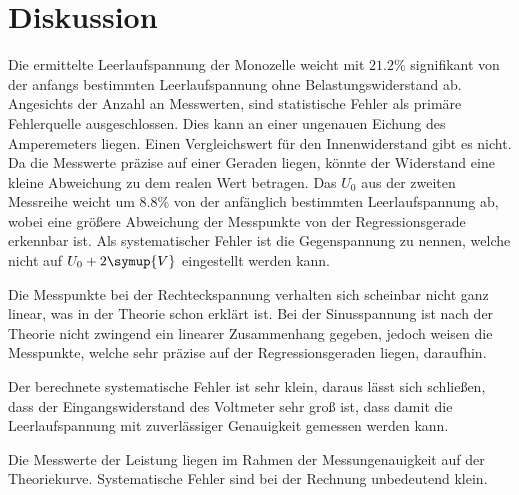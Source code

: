 \section{Diskussion}
\label{sec:Diskussion}

Die ermittelte Leerlaufspannung der Monozelle weicht mit $21.2 \%$ signifikant von der anfangs bestimmten Leerlaufspannung ohne
Belastungswiderstand ab. Angesichts der Anzahl an Messwerten, sind statistische Fehler als primäre Fehlerquelle ausgeschlossen.
Dies kann an einer ungenauen Eichung des Amperemeters liegen. Einen Vergleichswert für
den Innenwiderstand gibt es nicht. Da die Messwerte präzise auf einer Geraden liegen, könnte der Widerstand
eine kleine Abweichung zu dem realen Wert betragen. Das $U_0$ aus der zweiten Messreihe weicht um $8.8\%$
von der anfänglich bestimmten Leerlaufspannung ab, wobei eine größere Abweichung der Messpunkte von der Regressionsgerade
erkennbar ist. Als systematischer Fehler ist die Gegenspannung zu nennen, welche nicht auf $U_0 +2\symup{V}$
eingestellt werden kann.

Die Messpunkte bei der Rechteckspannung verhalten sich scheinbar nicht ganz linear, was in der Theorie schon erklärt ist. Bei der
Sinusspannung ist nach der Theorie nicht zwingend ein linearer Zusammenhang gegeben, jedoch weisen die Messpunkte, welche
sehr präzise auf der Regressionsgeraden liegen, daraufhin.

Der berechnete systematische Fehler ist sehr klein, daraus lässt sich schließen, dass der Eingangswiderstand des
Voltmeter sehr groß ist, dass damit die Leerlaufspannung mit zuverlässiger Genauigkeit gemessen werden kann.

Die Messwerte der Leistung liegen im Rahmen der Messungenauigkeit auf der Theoriekurve. Systematische Fehler
sind bei der Rechnung unbedeutend klein.
